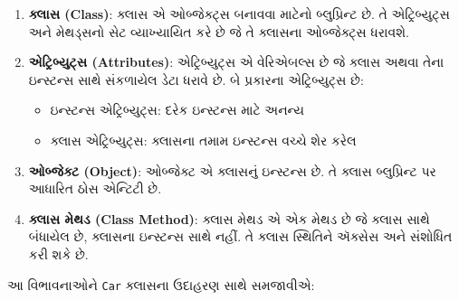 \begin{enumerate}
\def\labelenumi{\arabic{enumi}.}
\item
  \textbf{ક્લાસ (Class)}: ક્લાસ એ ઓબ્જેક્ટ્સ બનાવવા માટેનો બ્લુપ્રિન્ટ છે. તે
  એટ્રિબ્યુટ્સ અને મેથડ્સનો સેટ વ્યાખ્યાયિત કરે છે જે તે ક્લાસના ઓબ્જેક્ટ્સ ધરાવશે.
\item
  \textbf{એટ્રિબ્યુટ્સ (Attributes)}: એટ્રિબ્યુટ્સ એ વેરિએબલ્સ છે જે ક્લાસ અથવા તેના
  ઇન્સ્ટન્સ સાથે સંકળાયેલ ડેટા ધરાવે છે. બે પ્રકારના એટ્રિબ્યુટ્સ છે:

  \begin{itemize}
  \tightlist
  \item
    ઇન્સ્ટન્સ એટ્રિબ્યુટ્સ: દરેક ઇન્સ્ટન્સ માટે અનન્ય
  \item
    ક્લાસ એટ્રિબ્યુટ્સ: ક્લાસના તમામ ઇન્સ્ટન્સ વચ્ચે શેર કરેલ
  \end{itemize}
\item
  \textbf{ઓબ્જેક્ટ (Object)}: ઓબ્જેક્ટ એ ક્લાસનું ઇન્સ્ટન્સ છે. તે ક્લાસ બ્લુપ્રિન્ટ પર
  આધારિત ઠોસ એન્ટિટી છે.
\item
  \textbf{ક્લાસ મેથડ (Class Method)}: ક્લાસ મેથડ એ એક મેથડ છે જે ક્લાસ સાથે બંધાયેલ
  છે, ક્લાસના ઇન્સ્ટન્સ સાથે નહીં. તે ક્લાસ સ્થિતિને ઍક્સેસ અને સંશોધિત કરી શકે છે.
\end{enumerate}

આ વિભાવનાઓને \texttt{Car} ક્લાસના ઉદાહરણ સાથે સમજાવીએ:

